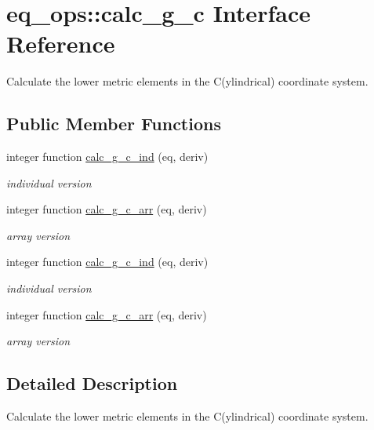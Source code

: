 \hypertarget{interfaceeq__ops_1_1calc__g__c}{}\section{eq\+\_\+ops\+:\+:calc\+\_\+g\+\_\+c Interface Reference}
\label{interfaceeq__ops_1_1calc__g__c}


Calculate the lower metric elements in the C(ylindrical) coordinate system.  


\subsection*{Public Member Functions}
\begin{DoxyCompactItemize}
\item 
integer function \hyperlink{interfaceeq__ops_1_1calc__g__c_a55dca52f3f82960703162dba425d358d}{calc\+\_\+g\+\_\+c\+\_\+ind} (eq, deriv)
\begin{DoxyCompactList}\small\item\em individual version \end{DoxyCompactList}\item 
integer function \hyperlink{interfaceeq__ops_1_1calc__g__c_a1694c8a9df96ab63255d533539020887}{calc\+\_\+g\+\_\+c\+\_\+arr} (eq, deriv)
\begin{DoxyCompactList}\small\item\em array version \end{DoxyCompactList}\item 
integer function \hyperlink{interfaceeq__ops_1_1calc__g__c_a55dca52f3f82960703162dba425d358d}{calc\+\_\+g\+\_\+c\+\_\+ind} (eq, deriv)
\begin{DoxyCompactList}\small\item\em individual version \end{DoxyCompactList}\item 
integer function \hyperlink{interfaceeq__ops_1_1calc__g__c_a1694c8a9df96ab63255d533539020887}{calc\+\_\+g\+\_\+c\+\_\+arr} (eq, deriv)
\begin{DoxyCompactList}\small\item\em array version \end{DoxyCompactList}\end{DoxyCompactItemize}


\subsection{Detailed Description}
Calculate the lower metric elements in the C(ylindrical) coordinate system. 

